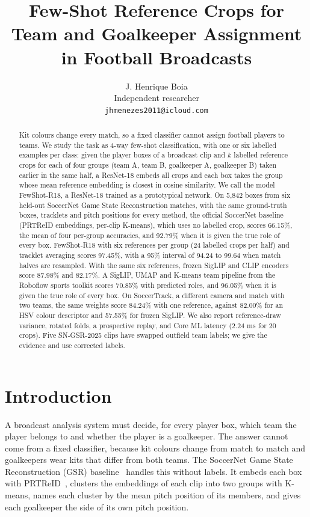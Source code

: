 \documentclass[10pt]{article}
\title{Few-Shot Reference Crops for Team and Goalkeeper Assignment\\in Football Broadcasts}
\author{J. Henrique Boia\\Independent researcher\\\texttt{jhmenezes2011@icloud.com}}
\date{}
\begin{document}
\maketitle

\begin{abstract}
Kit colours change every match, so a fixed classifier cannot assign football players to teams. We study the task as 4-way few-shot classification, with one or six labelled examples per class: given the player boxes of a broadcast clip and $k$ labelled reference crops for each of four groups (team A, team B, goalkeeper A, goalkeeper B) taken earlier in the same half, a ResNet-18 embeds all crops and each box takes the group whose mean reference embedding is closest in cosine similarity. We call the model FewShot-R18, a ResNet-18 trained as a prototypical network. On 5,842 boxes from six held-out SoccerNet Game State Reconstruction matches, with the same ground-truth boxes, tracklets and pitch positions for every method, the official SoccerNet baseline (PRTReID embeddings, per-clip K-means), which uses no labelled crop, scores 66.15\%, the mean of four per-group accuracies, and 92.79\% when it is given the true role of every box. FewShot-R18 with six references per group (24 labelled crops per half) and tracklet averaging scores 97.45\%, with a 95\% interval of 94.24 to 99.64 when match halves are resampled. With the same six references, frozen SigLIP and CLIP encoders score 87.98\% and 82.17\%. A SigLIP, UMAP and K-means team pipeline from the Roboflow sports toolkit scores 70.85\% with predicted roles, and 96.05\% when it is given the true role of every box. On SoccerTrack, a different camera and match with two teams, the same weights score 84.24\% with one reference, against 82.00\% for an HSV colour descriptor and 57.55\% for frozen SigLIP. We also report reference-draw variance, rotated folds, a prospective replay, and Core ML latency (2.24 ms for 20 crops). Five SN-GSR-2025 clips have swapped outfield team labels; we give the evidence and use corrected labels.
\end{abstract}

\section{Introduction}

A broadcast analysis system must decide, for every player box, which team the player belongs to and whether the player is a goalkeeper. The answer cannot come from a fixed classifier, because kit colours change from match to match and goalkeepers wear kits that differ from both teams. The SoccerNet Game State Reconstruction (GSR) baseline~\cite{somers2024soccernet} handles this without labels. It embeds each box with PRTReID~\cite{mansourian2024prtreid}, clusters the embeddings of each clip into two groups with K-means, names each cluster by the mean pitch position of its members, and gives each goalkeeper the side of its own pitch position.
\end{document}
